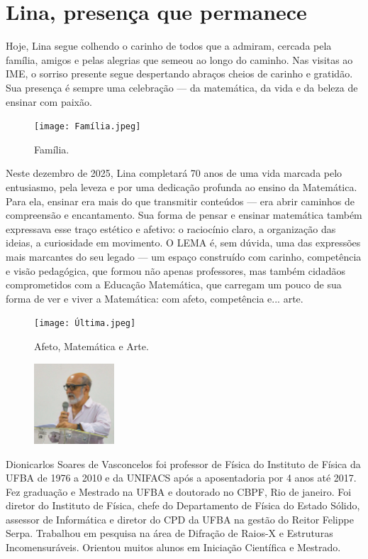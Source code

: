 \documentclass{hipatia}
\begin{document}
\section{Lina, presença que permanece}

Hoje, Lina segue colhendo o carinho de todos que a admiram, cercada pela família, amigos e pelas alegrias que semeou ao longo do caminho. Nas visitas ao IME, o sorriso presente segue despertando abraços cheios de carinho e gratidão. Sua presença é sempre uma celebração — da matemática, da vida e da beleza de ensinar com paixão.

\begin{figure}[htb!]
\texttt{[image: Família.jpeg]}
\caption{Família.}   
\end{figure}

Neste dezembro de 2025, Lina completará 70 anos de uma vida marcada pelo entusiasmo, pela leveza e por uma dedicação profunda ao ensino da Matemática. Para ela, ensinar era mais do que transmitir conteúdos — era abrir caminhos de compreensão e encantamento. Sua forma de pensar e ensinar matemática também expressava esse traço estético e afetivo: o raciocínio claro, a organização das ideias, a curiosidade em movimento. O LEMA é, sem dúvida, uma das expressões mais marcantes do seu legado — um espaço construído com carinho, competência e visão pedagógica, que formou não apenas professores, mas também cidadãos comprometidos com a Educação Matemática, que carregam um pouco de sua forma de ver e viver a Matemática: com afeto, competência e... arte.

\vfill

\nocite{*}


\pagebreak

\begin{figure}[htb!]
\texttt{[image: Última.jpeg]}
\caption{Afeto, Matemática e Arte.}   
\end{figure}


\pagebreak


\begin{figure}
	\centering
	\includegraphics[width=3cm]{Dioni.jpg}
\end{figure}\noindent
Dionicarlos Soares de Vasconcelos foi professor de Física do Instituto de Física da UFBA de 1976 a 2010 e da UNIFACS após a aposentadoria por 4 anos até 2017. Fez graduação e Mestrado na UFBA e doutorado no CBPF, Rio de janeiro. Foi diretor do Instituto de Física, chefe do Departamento de Física do Estado Sólido, assessor de Informática e diretor do CPD da UFBA na gestão do Reitor Felippe Serpa. Trabalhou em pesquisa na área de Difração de Raios-X e Estruturas Incomensuráveis. Orientou muitos alunos em Iniciação Científica e Mestrado.
\end{document}
